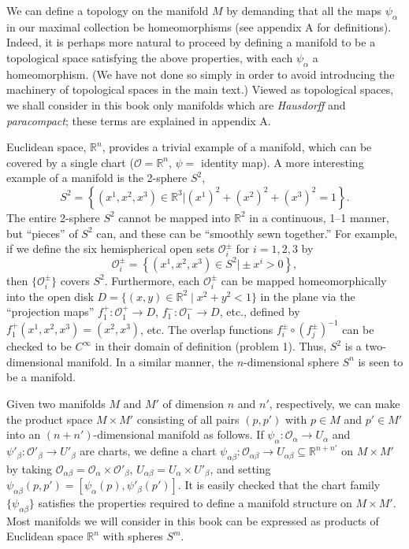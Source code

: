 We can define a topology on the manifold \(M\) by demanding that all the maps
\(\psi_\alpha\) in our maximal collection be homeomorphisms (see appendix A for
definitions).  Indeed, it is perhaps more natural to proceed by defining a manifold
to be a topological space satisfying the above properties, with each
\(\psi_\alpha\) a homeomorphism.  (We have not done so simply in order to avoid
introducing the machinery of topological spaces in the main text.)  Viewed as
topological spaces, we shall consider in this book only manifolds which are
\emph{Hausdorff} and \emph{paracompact}; these terms are explained in appendix A.



Euclidean space, \(\mathbb{R}^n\), provides a trivial example of a manifold, which
can be covered by a single chart (\(\mathcal O=\mathbb{R}^n\), \(\psi=\) identity
map).  A more interesting example of a manifold is the 2-sphere \(S^2\),
\[
  S^2=\left\{(x^1,x^2,x^3)\in\mathbb{R}^3\mathrel{\big|}
  (x^1)^2+(x^2)^2+(x^3)^2=1\right\}.
\]
The entire 2-sphere \(S^2\) cannot be mapped into \(\mathbb{R}^2\) in a
continuous, 1--1 manner, but ``pieces'' of \(S^2\) can, and these can be
``smoothly sewn together.''  For example, if we define the six hemispherical open
sets \(\mathcal O_i^\pm\) for \(i=1,2,3\) by
\[
  \mathcal O_i^\pm=
  \left\{(x^1,x^2,x^3)\in S^2\mathrel{\big|}\pm x^i>0\right\},
\]
then \(\{\mathcal O_i^\pm\}\) covers \(S^2\).  Furthermore, each
\(\mathcal O_i^\pm\) can be mapped homeomorphically into the open disk
\(D=\{(x,y)\in\mathbb{R}^2\mid x^2+y^2<1\}\) in the plane via the ``projection
maps'' \(f_1^+:\mathcal O_1^+\to D\), \(f_1^-:\mathcal O_1^-\to D\), etc.,
defined by \(f_1^+(x^1,x^2,x^3)=(x^2,x^3)\), etc.  The overlap functions
\(f_i^\pm\circ(f_j^\pm)^{-1}\) can be checked to be \(C^\infty\) in their domain
of definition (problem 1).  Thus, \(S^2\) is a two-dimensional manifold.  In a
similar manner, the \(n\)-dimensional sphere \(S^n\) is seen to be a manifold.

Given two manifolds \(M\) and \(M'\) of dimension \(n\) and \(n'\), respectively,
we can make the product space \(M\times M'\) consisting of all pairs \((p,p')\)
with \(p\in M\) and \(p'\in M'\) into an \((n+n')\)-dimensional manifold as
follows.  If \(\psi_\alpha:\mathcal O_\alpha\to U_\alpha\) and
\(\psi'_\beta:\mathcal O'_\beta\to U'_\beta\) are charts, we define a chart
\(\psi_{\alpha\beta}:\mathcal O_{\alpha\beta}\to U_{\alpha\beta}
\subseteq\mathbb{R}^{n+n'}\) on \(M\times M'\) by taking
\(\mathcal O_{\alpha\beta}=\mathcal O_\alpha\times\mathcal O'_\beta\),
\(U_{\alpha\beta}=U_\alpha\times U'_\beta\), and setting
\(\psi_{\alpha\beta}(p,p')=[\psi_\alpha(p),\psi'_\beta(p')]\).  It is easily
checked that the chart family \(\{\psi_{\alpha\beta}\}\) satisfies the properties
required to define a manifold structure on \(M\times M'\).  Most manifolds we
will consider in this book can be expressed as products of Euclidean space
\(\mathbb{R}^n\) with spheres \(S^m\).

